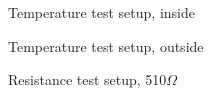 \begin{figure}[h]
    \centering
    \caption{Temperature test setup, inside}
    \label{fig:TM1}
\end{figure}

\begin{figure}[h]
    \centering
    \caption{Temperature test setup, outside}
    \label{fig:TM2}
\end{figure}

\begin{figure}[h]
    \centering
    \caption{Resistance test setup, 510$\Omega$}
    \label{fig:RM1}
\end{figure}

